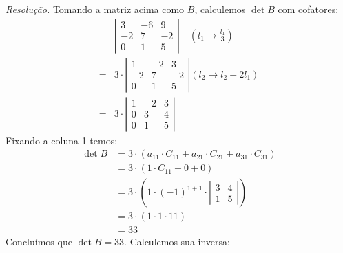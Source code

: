 \emph{Resolução.} Tomando a matriz acima como $B$, calculemos $\det B$ com cofatores:
	\begin{align*}
        &\left|\begin{array}{ccc}
            3 & -6 & 9 \\
            -2 & 7 & -2 \\
            0 & 1 & 5
            \end{array}\right| \quad (l_1 \rightarrow \frac{l_1}{3}) \\ =
        & 3 \cdot \left|\begin{array}{ccc}
            1 & -2 & 3 \\
            -2 & 7 & -2 \\
            0 & 1 & 5
            \end{array}\right| (l_2 \rightarrow l_2 + 2l_1) \\ =
        & 3 \cdot \left|\begin{array}{ccc}
            1 & -2 & 3 \\
            0 & 3 & 4 \\
            0 & 1 & 5
            \end{array}\right|
    \end{align*}
Fixando a coluna 1 temos:
\begin{align*}
    \det B &= 3 \cdot (a_{11} \cdot C_{11} + a_{21} \cdot C_{21} + a_{31}\cdot C_{31}) \\ &=
    3 \cdot (1 \cdot C_{11} + 0 + 0) \\ &=
    3 \cdot (1 \cdot (-1)^{1+1} \cdot 
	\left|\begin{array}{cc} 
		3 & 4 \\ 1 & 5 
	\end{array} \right|) \\ & =
	3 \cdot (1 \cdot 1 \cdot 11) \\ & = 
	33
\end{align*}
Concluímos que $\det B = 33$. Calculemos sua inversa:
